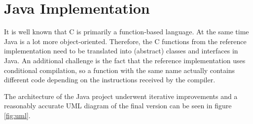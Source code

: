 \section{Java Implementation}
\label{sec:java-implementation}

It is well known that C is primarily a function-based language. At the same time Java is a lot more object-oriented. Therefore, the C functions from the reference implementation need to be translated into (abstract) classes and interfaces in Java. An additional challenge is the fact that the reference implementation uses conditional compilation, so a function with the same name actually contains different code depending on the instructions received by the compiler.

The architecture of the Java project underwent iterative improvements and a reasonably accurate UML diagram of the final version can be seen in figure \ref{fig:uml}.


